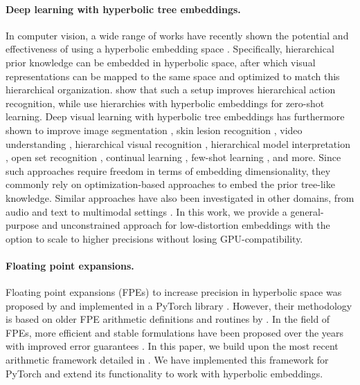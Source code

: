 \paragraph{Deep learning with hyperbolic tree embeddings.} In computer vision, a wide range of works have recently shown the potential and effectiveness of using a hyperbolic embedding space \citep{khrulkov2020hyperbolic}. Specifically, hierarchical prior knowledge can be embedded in hyperbolic space, after which visual representations can be mapped to the same space and optimized to match this hierarchical organization. \citep{long2020searching} show that such a setup improves hierarchical action recognition, while \citep{liu2020hyperbolic} use hierarchies with hyperbolic embeddings for zero-shot learning. Deep visual learning with hyperbolic tree embeddings has furthermore shown to improve image segmentation \citep{ghadimi2022hyperbolic}, skin lesion recognition \citep{yu2022skin}, video understanding \citep{li2024isolated}, hierarchical visual recognition \citep{ghadimi2021hyperbolic,dhall2020hierarchical}, hierarchical model interpretation \citep{gulshad2023hierarchical}, open set recognition \citep{dengxiong2023ancestor}, continual learning \citep{gao2023exploring}, few-shot learning \citep{zhang2022hyperbolic}, and more. Since such approaches require freedom in terms of embedding dimensionality, they commonly rely on optimization-based approaches to embed the prior tree-like knowledge. Similar approaches have also been investigated in other domains, from audio \citep{petermann2023hyperbolic} and text \citep{dhingra2018embedding,le2019inferring} to multimodal settings \citep{hong2023hyperbolic}. In this work, we provide a general-purpose and unconstrained approach for low-distortion embeddings with the option to scale to higher precisions without losing GPU-compatibility.

\vspace{-0.15cm}

\paragraph{Floating point expansions.}
Floating point expansions (FPEs) to increase precision in hyperbolic space was proposed by \citep{yu2021representing} and implemented in a PyTorch library \citep{yu2022mctensor}. However, their methodology is based on older FPE arithmetic definitions and routines by \citep{priest1991algorithms,priest1992properties,shewchuk1997adaptive}. In the field of FPEs, more efficient and stable formulations have been proposed over the years with improved error guarantees \mbox{\citep{joldes2014computation, joldes2015arithmetic, muller2016new}}. In this paper, we build upon the most recent arithmetic framework detailed in \citep{popescu2017towards}. We have implemented this framework for PyTorch and extend its functionality to work with hyperbolic embeddings.
